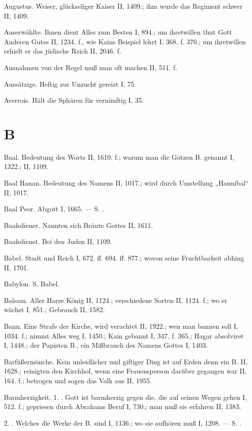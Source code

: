 Augustus. Weiser, glückseliger Kaiser II, 1409.; ihm wurde das Regiment schwer II, 1409.

Auserwählte. Ihnen dient Alles zum Besten I, 894.; um ihretwillen thut Gott Anderen Gutes II, 1234. f., wie Kains Beispiel lehrt I, 368. f. 370.; um ihretwillen erhielt er das jüdische Reich II, 2046. f.

Ausnahmen von der Regel muß man oft machen II, 511. f.

Aussätzige. Heftig zur Unzucht gereizt I, 75.

Averrois. Hält die Sphären für vernünftig I, 35.

\section{B}

Baal. Bedeutung des Worts II, 1610. f.; warum man die Götzen B. genannt I, 1322.; II, 1109.

Baal Hanan. Bedeutung des Namens II, 1017.; wird durch Umstellung „Hannibal“ II, 1017.

Baal Peor. Abgott I, 1665. — S. .

Baalsdiener. Nannten sich Bräute Gottes II, 1611.

Baalsdienst. Bei den Juden II, 1109.

Babel. Stadt und Reich I, 672. ff. 694. ff. 877.; wovon seine Fruchtbarkeit abhing II, 1701.

Babylon. S. Babel.

Balsam. Aller Harze König II, 1124.; verschiedene Sorten II, 1124. f.; wo er wächst I, 851.; Gebrauch II, 1582.

Bann. Eine Strafe der Kirche, wird verachtet II, 1922.; wen man bannen soll I, 1034. f.; nimmt Alles weg I, 1450.; Kain gebannt I, 347. f. 365.; Hagar absolviret I, 1448.; der Papisten B., ein Mißbrauch des Namens Gottes I, 1403.

Barfüßermönche. Kein unleidlicher und giftiger Ding ist auf Erden denn ein B. II, 1628.; reinigten den Kirchhof, wenn eine Frauensperson darüber gegangen war II, 164. f.; betrogen und sogen das Volk aus II, 1955.

Barmherzigkeit. 1. . Gott ist barmherzig gegen die, die auf seinen Wegen gehen I, 512. f.; gepriesen durch Abrahams Beruf I, 730.; man muß sie erfahren II, 1383.

2. . Welches die Werke der B. sind I, 1136.; wo sie aufhören muß I, 1208. — S. .

